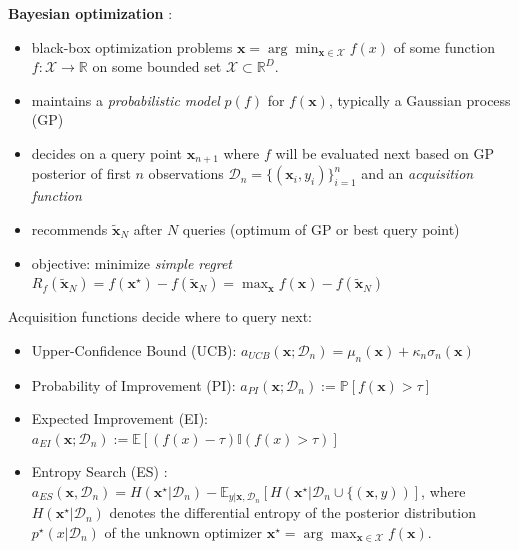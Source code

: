 \begin{block}{}
\textbf{Bayesian optimization} \cite{shahriari_taking_2016}:
\begin{itemize}
\item black-box optimization problems $\mathbf{x} = \arg\min_{\mathbf{x} \in \mathcal{X}} f(x)$ of some function $f: \mathcal{X} \to \mathbb{R}$ on some bounded set $\mathcal{X} \subset \mathbb{R}^D$.
\item maintains a \emph{probabilistic model} $p(f)$ for $f(\mathbf{x})$, typically a Gaussian process (GP)
\item decides on a query point $\mathbf{x}_{n+1}$ where $f$ will be evaluated next based on GP posterior of first $n$ observations $\mathcal{D}_n=\{(\mathbf{x}_i, y_i)\}_{i=1}^n$ and an \emph{acquisition function}
\item recommends $\mathbf{\tilde x}_N$ after $N$ queries (optimum of GP or best query point)
\item objective: minimize \emph{simple regret} 
$R_f(\mathbf{\tilde  x}_N) = f(\mathbf{x}^\star) - f(\mathbf{\tilde  x}_N) = \max_{\mathbf{x}} f(\mathbf{x}) - f(\mathbf{\tilde x}_N)$
\end{itemize}

Acquisition functions decide where to query next:
\begin{itemize}
\item Upper-Confidence Bound (UCB): $a_{UCB}(\mathbf{x};
\mathcal{D}_n) = \mu_{n}(\mathbf{x}) + \kappa_n \sigma_{n}(\mathbf{x})$
\item Probability of Improvement (PI): $a_{PI}(\mathbf{x}; \mathcal{D}_n) := \mathbb{P}[f(\mathbf{x}) > \tau]$
\item Expected Improvement (EI): $a_{EI}(\mathbf{x}; \mathcal{D}_n) := \mathbb{E}[(f(x) - \tau)\mathbb{I}(f(x) > \tau)]$
\item Entropy Search (ES) \cite{hennig_entropy_2012}: $a_{ES}(\mathbf{x}, \mathcal{D}_n)
  = H(\mathbf{x}^\star \vert \mathcal{D}_n) - \mathbb{E}_{y \vert \mathbf{x}, \mathcal{D}_n}
	[H(\mathbf{x}^\star \vert \mathcal{D}_n \cup \{(\mathbf{x}, y))]$,
	where $H(\mathbf{x}^\star \vert \mathcal{D}_n)$ denotes the differential entropy
of the posterior distribution $p^\star(x \vert \mathcal{D}_n)$ of the unknown optimizer $\mathbf{x}^\star = \arg\max_{\mathbf{x} \in \mathcal{X}} f(\mathbf{x})$.
\end{itemize}

\end{block}

